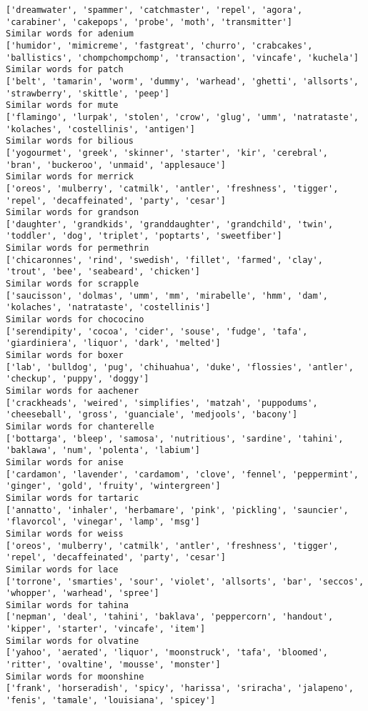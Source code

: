 \documentclass[11pt]{article}
\begin{document}
\begin{Verbatim}[commandchars=\\\{\}]
['dreamwater', 'spammer', 'catchmaster', 'repel', 'agora', 'carabiner', 'cakepops', 'probe', 'moth', 'transmitter']
Similar words for adenium
['humidor', 'mimicreme', 'fastgreat', 'churro', 'crabcakes', 'ballistics', 'chompchompchomp', 'transaction', 'vincafe', 'kuchela']
Similar words for patch
['belt', 'tamarin', 'worm', 'dummy', 'warhead', 'ghetti', 'allsorts', 'strawberry', 'skittle', 'peep']
Similar words for mute
['flamingo', 'lurpak', 'stolen', 'crow', 'glug', 'umm', 'natrataste', 'kolaches', 'costellinis', 'antigen']
Similar words for bilious
['yogourmet', 'greek', 'skinner', 'starter', 'kir', 'cerebral', 'bran', 'buckeroo', 'unmaid', 'applesauce']
Similar words for merrick
['oreos', 'mulberry', 'catmilk', 'antler', 'freshness', 'tigger', 'repel', 'decaffeinated', 'party', 'cesar']
Similar words for grandson
['daughter', 'grandkids', 'granddaughter', 'grandchild', 'twin', 'toddler', 'dog', 'triplet', 'poptarts', 'sweetfiber']
Similar words for permethrin
['chicaronnes', 'rind', 'swedish', 'fillet', 'farmed', 'clay', 'trout', 'bee', 'seabeard', 'chicken']
Similar words for scrapple
['saucisson', 'dolmas', 'umm', 'mm', 'mirabelle', 'hmm', 'dam', 'kolaches', 'natrataste', 'costellinis']
Similar words for chococino
['serendipity', 'cocoa', 'cider', 'souse', 'fudge', 'tafa', 'giardiniera', 'liquor', 'dark', 'melted']
Similar words for boxer
['lab', 'bulldog', 'pug', 'chihuahua', 'duke', 'flossies', 'antler', 'checkup', 'puppy', 'doggy']
Similar words for aachener
['crackheads', 'weired', 'simplifies', 'matzah', 'puppodums', 'cheeseball', 'gross', 'guanciale', 'medjools', 'bacony']
Similar words for chanterelle
['bottarga', 'bleep', 'samosa', 'nutritious', 'sardine', 'tahini', 'baklawa', 'num', 'polenta', 'labium']
Similar words for anise
['cardamon', 'lavender', 'cardamom', 'clove', 'fennel', 'peppermint', 'ginger', 'gold', 'fruity', 'wintergreen']
Similar words for tartaric
['annatto', 'inhaler', 'herbamare', 'pink', 'pickling', 'sauncier', 'flavorcol', 'vinegar', 'lamp', 'msg']
Similar words for weiss
['oreos', 'mulberry', 'catmilk', 'antler', 'freshness', 'tigger', 'repel', 'decaffeinated', 'party', 'cesar']
Similar words for lace
['torrone', 'smarties', 'sour', 'violet', 'allsorts', 'bar', 'seccos', 'whopper', 'warhead', 'spree']
Similar words for tahina
['nepman', 'deal', 'tahini', 'baklava', 'peppercorn', 'handout', 'kipper', 'starter', 'vincafe', 'item']
Similar words for olvatine
['yahoo', 'aerated', 'liquor', 'moonstruck', 'tafa', 'bloomed', 'ritter', 'ovaltine', 'mousse', 'monster']
Similar words for moonshine
['frank', 'horseradish', 'spicy', 'harissa', 'sriracha', 'jalapeno', 'fenis', 'tamale', 'louisiana', 'spicey']

\end{Verbatim}
\end{document}
